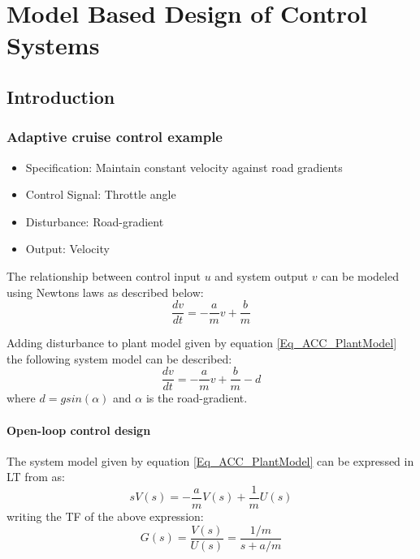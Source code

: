 \part{Model Based Design of Control Systems}

\chapter{Introduction}

\section{Adaptive cruise control example}

\begin{itemize}
	\item Specification: Maintain constant velocity against road gradients
	\item Control Signal: Throttle angle
	\item Disturbance: Road-gradient
	\item Output: Velocity
\end{itemize}

The relationship between control input $u$ and system output $v$ can be modeled using Newtons laws as described below:
\begin{equation}\label{Eq_ACC_PlantModel}
	\frac{dv}{dt} = -\frac{a}{m}v + \frac{b}{m}
\end{equation}

Adding disturbance to plant model given by equation \eqref{Eq_ACC_PlantModel} the following system model can be described:
\begin{equation} \label{Eq_ACC_PlantModel_with_d}
	\frac{dv}{dt} = -\frac{a}{m}v + \frac{b}{m} -d
\end{equation}
where $d = g sin(\alpha)$ and $\alpha$ is the road-gradient.

\subsection{Open-loop control design}

The system model given by equation \eqref{Eq_ACC_PlantModel} can be expressed in LT from as:
\begin{equation}
	s V(s) = -\frac{a}{m}V(s) + \frac{1}{m} U(s)
\end{equation}
writing the TF of the above expression:
\begin{equation}
	G(s) = \frac{V(s)}{U(s)} = \frac{1/m}{s + a/m}
\end{equation}

